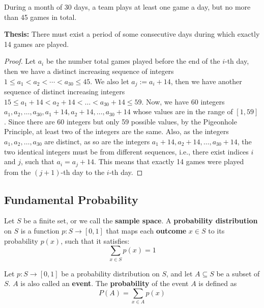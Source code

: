\begin{example}
    During a month of 30 days, a team plays at least one game a day, but no more than 45 games in total.

    \textbf{Thesis:} There must exist a period of some consecutive days during which exactly 14 games are
    played.

    \begin{proof}
        Let $a_i$ be the number total games played before the end of the $i$-th day, then we have
        a distinct increasing sequence of integers $1\leq a_1<a_2<\cdots<a_{30}\leq 45$. We also let
        $a_j := a_i+14$, then we have another sequence of distinct increasing integers
        $15\leq a_1+14<a_2+14<\ldots<a_{30}+14\leq 59$. Now, we have 60 integers $a_1, a_2, \ldots, a_{30},
        a_1+14, a_2+14, \ldots, a_{30}+14$ whose values are in the range of $[1, 59]$. Since there are
        60 integers but only 59 possible values, by the Pigeonhole Principle, at least two of the integers
        are the same. Also, as the integers $a_1, a_2, \ldots, a_30$ are distinct, as so are the integers
        $a_1+14, a_2+14, \ldots, a_{30}+14$, the two identical integers must be from different sequences,
        i.e., there exist indices $i$ and $j$, such that $a_i = a_j + 14$. This means that exactly 14 games
        were played from the $(j+1)$-th day to the $i$-th day.
    \end{proof}
\end{example}

\subsection{Fundamental Probability}

\begin{definition}
    Let $S$ be a finite set, or we call the \textbf{sample space}.
    A \textbf{probability distribution} on $S$ is a function
    $p:S\to[0,1]$ that maps each \textbf{outcome} $x\in S$ to its probability $p(x)$, such that
    it satisfies:
    \[
        \sum_{x\in S} p(x) = 1
    \]
\end{definition}

\begin{definition}
    Let $p:S\to[0,1]$ be a probability distribution on $S$, and let $A\subseteq S$ be a subset of $S$.
    $A$ is also called an \textbf{event}. The \textbf{probability} of the event $A$ is defined as
    \[
        P(A) = \sum_{x\in A} p(x)
    \]
\end{definition}


